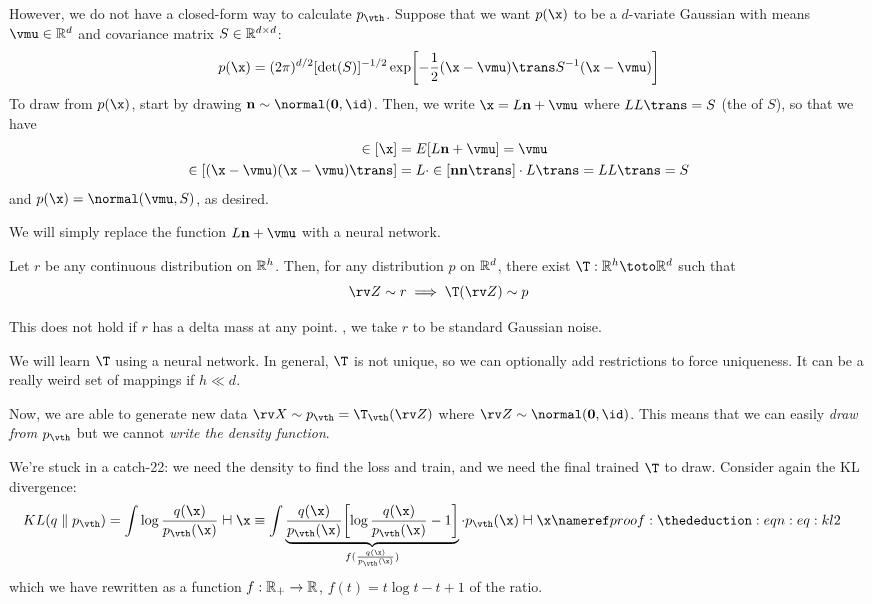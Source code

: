 \documentclass[class=cs480,notes,tikz]{agony}
\begin{document}
However, we do not have a closed-form way to calculate $p_{\vth}$.
Suppose that we want $p(\x)$ to be a $d$-variate Gaussian with means $\vmu \in \R^d$
and covariance matrix $S \in \mathbb{R}^{d \times d}$:
\[ p(\x) = (2\pi)^{d/2}[\det(S)]^{-1/2}\exp[-\frac12(\x-\vmu)\trans S^{-1}(\x-\vmu)] \]
To draw from $p(\x)$, start by drawing $\vb n \sim \normal(\vb 0, \id)$.
Then, we write $\x = L\vb n + \vmu$ where $LL\trans = S$
(the  of $S$),
so that we have
\begin{align*}
  \E[\x]                       & = E[L\vb n + \vmu] = \vmu                                  \\
  \E[(\x-\vmu)(\x-\vmu)\trans] & = L\cdot\E[\vb n \vb n\trans] \cdot L\trans = LL\trans = S
\end{align*}
and $p(\x) = \normal(\vmu,S)$, as desired.

We will simply replace the function $L\vb n + \vmu$ with a neural network.

\begin{theorem}\label{thm:push}
  Let $r$ be any continuous distribution on $\mathbb{R}^h$.
  Then, for any distribution $p$ on $\mathbb{R}^d$, there exist 
  $\T : \R^h \toto \R^d$ such that
  \[ \rv Z \sim r \implies \T(\rv Z) \sim p \]
\end{theorem}

This does not hold if $r$ has a delta mass at any point.
\WLOG, we take $r$ to be standard Gaussian noise.

We will learn $\T$ using a neural network.
In general, $\T$ is not unique, so we can optionally add restrictions to force uniqueness.
It can be a really weird set of mappings if $h \ll d$.

Now, we are able to generate new data $\rv X \sim p_{\vth} = \T_{\vth}(\rv Z)$
where $\rv Z \sim \normal(\vb 0,\id)$.
This means that we can easily \emph{draw from $p_{\vth}$}
but we cannot \emph{write the density function}.

We're stuck in a catch-22: we need the density to find the loss and train,
and we need the final trained $\T$ to draw.
Consider again the KL divergence:
\begin{align*}
  KL(q \parallel p_{\vth}) & = \int \log\frac{q(\x)}{p_{\vth}(\x)} \dd{\x}
  \equiv \int \underbrace{\frac{q(\x)}{p_{\vth}(\x)}\qty[\log\frac{q(\x)}{p_{\vth}(\x)}-1]}_{f(\frac{q(\x)}{p_{\vth}(\x)})} \cdot p_{\vth}(\x) \dd{\x} \nr{eq:kl2}
\end{align*}
which we have rewritten as a function $f : \mathbb{R}_+ \to \mathbb{R}$, $f(t) = t\log t - t + 1$ of the ratio.
\end{document}

